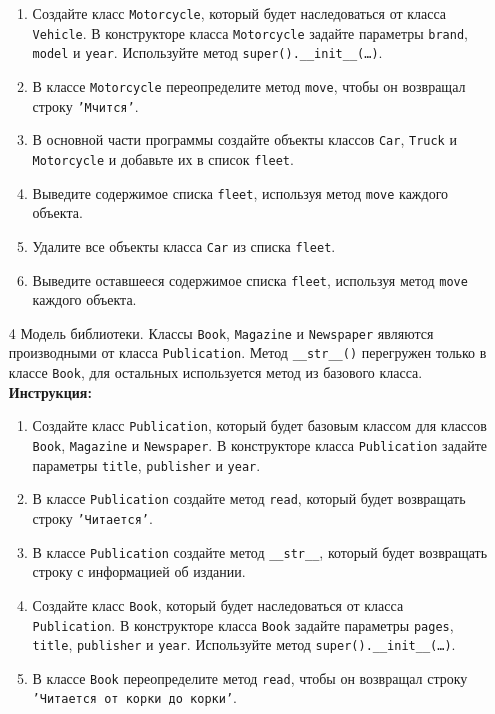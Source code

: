 \begin{enumerate}
\begin{enumerate}
    \item Создайте класс \texttt{Motorcycle}, который будет наследоваться от класса \texttt{Vehicle}. В конструкторе класса \texttt{Motorcycle} задайте параметры \texttt{brand}, \texttt{model} и \texttt{year}. Используйте метод \texttt{super().\_\_init\_\_(\ldots)}.
    \item В классе \texttt{Motorcycle} переопределите метод \texttt{move}, чтобы он возвращал строку \texttt{'Мчится'}.
    \item В основной части программы создайте объекты классов \texttt{Car}, \texttt{Truck} и \texttt{Motorcycle} и добавьте их в список \texttt{fleet}.
    \item Выведите содержимое списка \texttt{fleet}, используя метод \texttt{move} каждого объекта.
    \item Удалите все объекты класса \texttt{Car} из списка \texttt{fleet}.
    \item Выведите оставшееся содержимое списка \texttt{fleet}, используя метод \texttt{move} каждого объекта.
\end{enumerate}
\item[4]
Модель библиотеки. Классы \texttt{Book}, \texttt{Magazine} и \texttt{Newspaper} являются производными от класса \texttt{Publication}. Метод \texttt{\_\_str\_\_()} перегружен только в классе \texttt{Book}, для остальных используется метод из базового класса.
\textbf{Инструкция:}
\begin{enumerate}
    \item Создайте класс \texttt{Publication}, который будет базовым классом для классов \texttt{Book}, \texttt{Magazine} и \texttt{Newspaper}. В конструкторе класса \texttt{Publication} задайте параметры \texttt{title}, \texttt{publisher} и \texttt{year}.
    \item В классе \texttt{Publication} создайте метод \texttt{read}, который будет возвращать строку \texttt{'Читается'}.
    \item В классе \texttt{Publication} создайте метод \texttt{\_\_str\_\_}, который будет возвращать строку с информацией об издании.
    \item Создайте класс \texttt{Book}, который будет наследоваться от класса \texttt{Publication}. В конструкторе класса \texttt{Book} задайте параметры \texttt{pages}, \texttt{title}, \texttt{publisher} и \texttt{year}. Используйте метод \texttt{super().\_\_init\_\_(\ldots)}.
    \item В классе \texttt{Book} переопределите метод \texttt{read}, чтобы он возвращал строку \texttt{'Читается от корки до корки'}.

\end{enumerate}
\end{enumerate}
